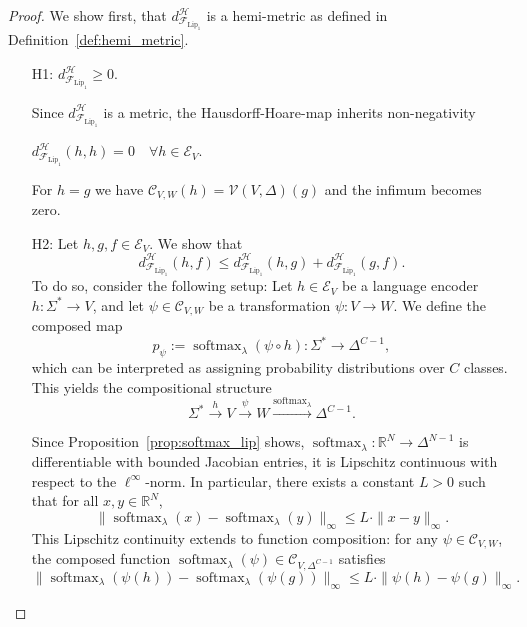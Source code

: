 \begin{proof}
We show first, that $d_{\mathcal{F}_{\mathrm{Lip}_1}}^{\mathcal{H}}$ is a hemi-metric as defined in Definition~\ref{def:hemi_metric}. 


\begin{itemize}
    \item [H1:] $d_{\mathcal{F}_{\mathrm{Lip}_1}}^{\mathcal{H}} \geq 0$.
    \item[] Since $d_{\mathcal{F}_{\mathrm{Lip}_1}}^{\mathcal{H}}$ is a metric, the Hausdorff-Hoare-map inherits non-negativity
    \item [] $d_{\mathcal{F}_{\mathrm{Lip}_1}}^{\mathcal{H}}(h,h) =  0 \quad \forall h \in \mathcal{E}_V$.
    \item[] For $h=g$ we have $\mathcal{C}_{V,W}(h)=\mathcal{V}(V,\Delta)(g)$ and the infimum becomes zero.
    \item [H2:] Let \( h, g, f \in \mathcal{E}_V \).
    We show that
    \[
    d_{\mathcal{F}_{\mathrm{Lip}_1}}^{\mathcal{H}}(h,f) \leq d_{\mathcal{F}_{\mathrm{Lip}_1}}^{\mathcal{H}}(h,g) + d_{\mathcal{F}_{\mathrm{Lip}_1}}^{\mathcal{H}}(g,f).
    \]
    To do so, consider the following setup: Let \( h \in \mathcal{E}_V \) be a language encoder \( h: \Sigma^* \to V \), and let \( \psi \in \mathcal{C}_{V,W} \) be a transformation \( \psi: V \to W \). We define the composed map
    \[ p_\psi := \operatorname{softmax}_\lambda(\psi \circ h ): \Sigma^* \to \Delta^{C-1},
    \]
    which can be interpreted as assigning probability distributions over \( C \) classes. This yields the compositional structure
    \[
    \Sigma^* \xrightarrow{h} V \xrightarrow{\psi} W \xrightarrow{\operatorname{softmax}_\lambda} \Delta^{C-1}.
    \]

    
Since Proposition~\ref{prop:softmax_lip} shows, \( \operatorname{softmax}_\lambda \colon \mathbb{R}^N \to \Delta^{N-1} \) is differentiable with bounded Jacobian entries, it is Lipschitz continuous with respect to the \( \ell^\infty \)-norm. In particular, there exists a constant \( L > 0 \) such that for all \( x, y \in \mathbb{R}^N \),
\[
\|\operatorname{softmax}_\lambda(x) - \operatorname{softmax}_\lambda(y)\|_\infty \leq L \cdot \|x - y\|_\infty.
\]
This Lipschitz continuity extends to function composition: for any \( \psi \in \mathcal{C}_{V,W} \), the composed function \( \operatorname{softmax}_\lambda( \psi) \in \mathcal{C}_{V,\Delta^{C-1}} \) satisfies
\[
\| \operatorname{softmax}_\lambda(\psi(h)) - \operatorname{softmax}_\lambda(\psi(g)) \|_\infty \leq L \cdot \| \psi(h) - \psi(g) \|_\infty.
\]


\end{itemize}
\end{proof}

